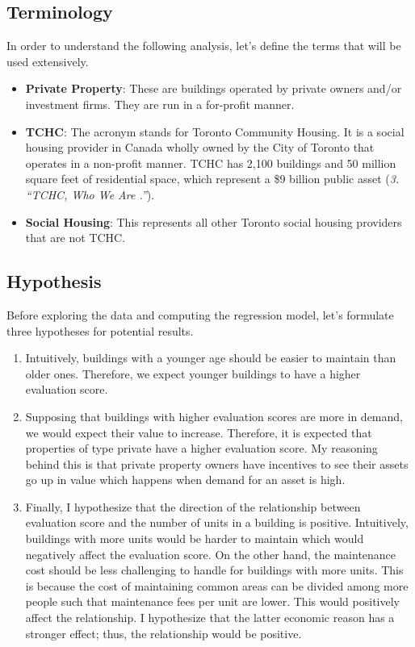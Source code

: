 \documentclass[
]{article}
\begin{document}
\hypertarget{terminology}{%
\subsection{Terminology}\label{terminology}}

In order to understand the following analysis, let's define the terms
that will be used extensively.

\begin{itemize}
\item
  \textbf{Private Property}: These are buildings operated by private
  owners and/or investment firms. They are run in a for-profit manner.
\item
  \textbf{TCHC}: The acronym stands for Toronto Community Housing. It is
  a social housing provider in Canada wholly owned by the City of
  Toronto that operates in a non-profit manner. TCHC has 2,100 buildings
  and 50 million square feet of residential space, which represent a \$9
  billion public asset (\emph{3. ``TCHC, Who We Are .''}).
\item
  \textbf{Social Housing}: This represents all other Toronto social
  housing providers that are not TCHC.
\end{itemize}

\hypertarget{hypothesis}{%
\subsection{Hypothesis}\label{hypothesis}}

Before exploring the data and computing the regression model, let's
formulate three hypotheses for potential results.

\begin{enumerate}
\def\labelenumi{\arabic{enumi}.}
\item
  Intuitively, buildings with a younger age should be easier to maintain
  than older ones. Therefore, we expect younger buildings to have a
  higher evaluation score.
\item
  Supposing that buildings with higher evaluation scores are more in
  demand, we would expect their value to increase. Therefore, it is
  expected that properties of type private have a higher evaluation
  score. My reasoning behind this is that private property owners have
  incentives to see their assets go up in value which happens when
  demand for an asset is high.
\item
  Finally, I hypothesize that the direction of the relationship between
  evaluation score and the number of units in a building is positive.
  Intuitively, buildings with more units would be harder to maintain
  which would negatively affect the evaluation score. On the other hand,
  the maintenance cost should be less challenging to handle for
  buildings with more units. This is because the cost of maintaining
  common areas can be divided among more people such that maintenance
  fees per unit are lower. This would positively affect the
  relationship. I hypothesize that the latter economic reason has a
  stronger effect; thus, the relationship would be positive.
\end{enumerate}
\end{document}
